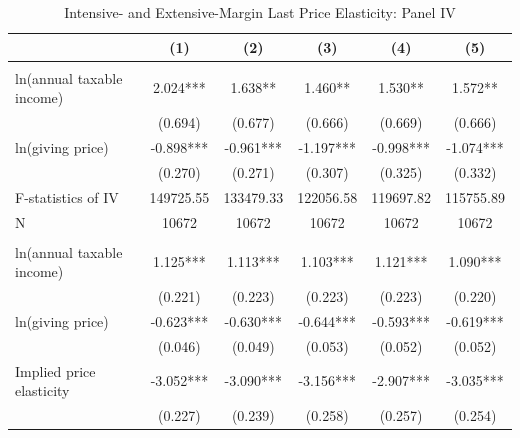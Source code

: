 \documentclass[
  11pt,
  a4paper,
]{article}
\begin{document}
  \begin{table}

  \caption{\label{tab:kableLastElasticity2}Intensive- and Extensive-Margin Last Price Elasticity: Panel IV}
  \centering
  \fontsize{7}{9}\selectfont
  \begin{threeparttable}
  \begin{tabular}[t]{lccccc}
  \toprule
   & (1) & (2) & (3) & (4) & (5)\\
  \midrule
  \addlinespace[0.3em]
  \multicolumn{6}{l}{\textbf{Intensive-Margin Elasticity}}\\
  \hspace{1em}ln(annual taxable income) & 2.024*** & 1.638** & 1.460** & 1.530** & 1.572**\\
  \hspace{1em} & (0.694) & (0.677) & (0.666) & (0.669) & (0.666)\\
  \hspace{1em}ln(giving price) & -0.898*** & -0.961*** & -1.197*** & -0.998*** & -1.074***\\
  \hspace{1em} & (0.270) & (0.271) & (0.307) & (0.325) & (0.332)\\
  \hspace{1em}F-statistics of IV & 149725.55 & 133479.33 & 122056.58 & 119697.82 & \vphantom{1} 115755.89\\
  \hspace{1em}N & 10672 & 10672 & 10672 & 10672 & 10672\\
  \addlinespace[0.3em]
  \multicolumn{6}{l}{\textbf{Extensive-Margin Elasticity}}\\
  \hspace{1em}ln(annual taxable income) & 1.125*** & 1.113*** & 1.103*** & 1.121*** & 1.090***\\
  \hspace{1em} & (0.221) & (0.223) & (0.223) & (0.223) & (0.220)\\
  \hspace{1em}ln(giving price) & -0.623*** & -0.630*** & -0.644*** & -0.593*** & -0.619***\\
  \hspace{1em} & (0.046) & (0.049) & (0.053) & (0.052) & (0.052)\\
  \hspace{1em}Implied price elasticity & -3.052*** & -3.090*** & -3.156*** & -2.907*** & -3.035***\\
  \hspace{1em} & (0.227) & (0.239) & (0.258) & (0.257) & (0.254)\\

\end{tabular}
\end{threeparttable}
\end{table}
\end{document}
